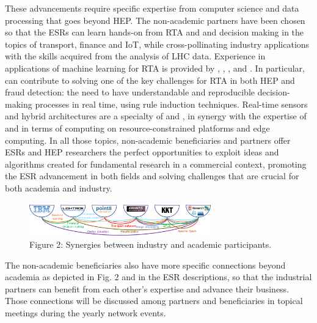 These advancements require specific expertise from computer science and data processing that goes beyond HEP. 
The non-academic partners have been chosen so that the ESRs can learn hands-on from RTA and and decision making in the topics of transport, finance and IoT, while cross-pollinating industry applications with the skills acquired from the analysis of LHC data. 
Experience in applications of machine learning for RTA is provided by \liegesentity, \uniboentity, \ibmentity, \ximantisentity and \pointeightentity. 
In particular, \ibmentity can contribute to solving one of the key challenges for RTA in both HEP and fraud detection: the need to have understandable and reproducible decision-making processes in real time, using rule induction techniques. 
Real-time sensors and hybrid architectures are a specialty of \lightboxentity and \fleetmaticsentity, in synergy with the expertise of \uniboentity and \sorbonneentity in terms of computing on resource-constrained platforms and edge computing. 
In all those topics, non-academic beneficiaries and partners offer ESRs and HEP researchers the perfect opportunities to exploit ideas and algorithms created for fundamental research in a commercial context, promoting the ESR advancement in both fields and solving challenges that are crucial for both academia and industry. 

\begin{figure}
	\includegraphics[width=0.7\textwidth]{figs/SMARTHEP_InteractionIndustryAcademia} %
	\caption*{Figure 2: Synergies between industry and academic participants.\label{fig:synergies}}
\end{figure}
The non-academic beneficiaries also have more specific connections beyond academia as depicted in Fig. 2 and in the ESR descriptions, so that the industrial partners can benefit from each other's expertise and advance their business. Those connections will be discussed among partners and beneficiaries in topical meetings during the yearly network events. 

